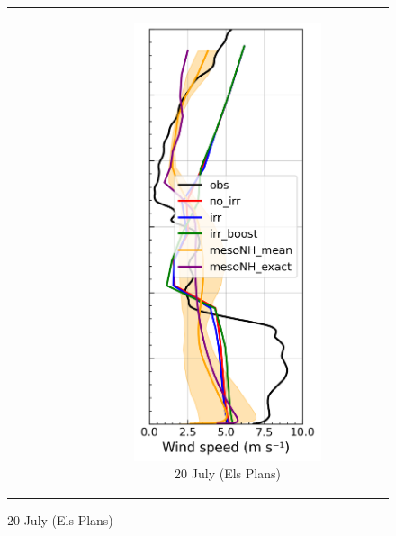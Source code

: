 \begin{figure}[hbtp]
{\begin{tabular}{@{}cccc@{}}
\begin{subfigure}[t]{0.289\textwidth}
        \end{subfigure} &
        \begin{subfigure}[t]{0.283\textwidth}
            \caption{20 July (Els Plans)}
            \includegraphics[width=\textwidth]{images/chap5/profiles/profile_elsplans_wind_speed_2007_.png}

\end{subfigure}
\end{tabular}}
\end{figure}
